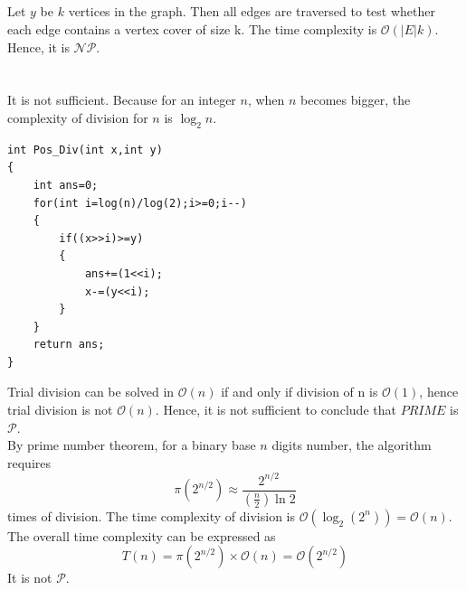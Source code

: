 \documentclass[12pt,a4paper]{article}
\theoremstyle{definition}
\begin{document}
\subsection{}
    Let $y$ be $k$ vertices in the graph. Then all edges are traversed to test whether each edge contains a vertex cover of size k. The time complexity is $\mathcal{O}(\left| E \right|k)$. Hence, it is $\mathcal{NP}$.
\section{}
It is not sufficient.
Because for an integer $n$, when $n$ becomes bigger, the complexity of division for $n$ is $\log_2n$.
\begin{lstlisting}
int Pos_Div(int x,int y)
{
	int ans=0;
	for(int i=log(n)/log(2);i>=0;i--)
	{
		if((x>>i)>=y)
		{
			ans+=(1<<i);
			x-=(y<<i);
		}
	}
	return ans;
}
\end{lstlisting}
Trial division can be solved in $\mathcal{O}(n)$ if and only if division of n is $\mathcal{O}(1)$, hence trial division is not $\mathcal{O}(n)$. Hence, it is not sufficient to conclude that $PRIME$ is $\mathcal{P}$. \\
By prime number theorem, for a binary base $n$ digits number, the algorithm requires
$$
\pi\left(2^{n / 2}\right) \approx \frac{2^{n / 2}}{\left(\frac{n}{2}\right) \ln 2}
$$
times of division. The time complexity of division is $\mathcal{O}(\log_2(2^n))=\mathcal{O}(n)$. The overall time complexity can be expressed as
$$
    T(n) = \pi\left(2^{n / 2}\right) \times  \mathcal{O}(n) = \mathcal{O}(2^{n / 2})
$$
It is not $\mathcal{P}$.
\end{document}
